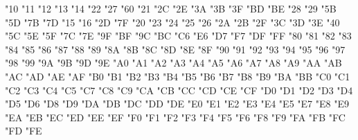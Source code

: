 \begindomaintable\relax
%
%
"10 \tldblquoteleft
"11 \tldblquoteright
"12 \tldblquotebase
"13 \tlguillemetleft
"14 \tlguillemetright
"22 \tldblquote
"27 \tlquoteright*
"60 \tlquoteleft*
\enddomaintable
\begindomaintable\relax
%
%
"21 \tlexclam*
"2C \tlcomma*
"2E \tlperiod*
"3A \tlcolon*
"3B \tlsemicolon*
"3F \tlquestion*
"BD \tlexclamdown
"BE \tlquestiondown
\enddomaintable
\begindomaintable\relax
%
%
"28 \tlparenleft*
"29 \tlparenright*
"5B \tlbracketleft*
"5D \tlbracketright*
"7B \tlbraceleft*
"7D \tlbraceright*
\enddomaintable
\begindomaintable\relax
%
%
"15 \tlendash
"16 \tlemdash
"2D \tlhyphen*
"7F \tlhyphenchar*
\enddomaintable
\begindomaintable\relax
%
%
"20 \tlvisiblespace
"23 \tlnumbersign*
"24 \tldollar*
"25 \tlpercent*
"26 \tlampersand*
"2A \tlastersik*
"2B \tlplus*
"2F \tlslash*
"3C \tlless*
"3D \tlequal*
"3E \tlgreater*
"40 \tlat*
"5C \tlbackslash*
"5E \tlasciicircumflex*
"5F \tlunderscore*
"7C \tlbar*
"7E \tlasciitilde*
"9F \tlsection
"BF \tlsterling
\enddomaintable
\begindomaintable\relax
%
%
"9C \tlIJ
"BC \tlij
"C6 \tlAE
"E6 \tlae
"D7 \tlOE
"F7 \tloe
"DF \tlEsZet
"FF \tleszet
\enddomaintable
\begindomaintable\relax
%
%
"80 \tlAbreve
"81 \tlAogonek
"82 \tlCacute
"83 \tlCcaron
"84 \tlDcaron
"85 \tlEcaron
"86 \tlEogonek
"87 \tlGbreve
"88 \tlLacute
"89 \tlLcaron
"8A \tlLslash
"8B \tlNacute
"8C \tlNcaron
"8D \tlEng
"8E \tlOhungarumlaut
"8F \tlRacute
"90 \tlRcaron
"91 \tlSacute
"92 \tlScaron
"93 \tlScommaaccent
"94 \tlTcaron
"95 \tlTcommaaccent
"96 \tlUhungarumlaut
"97 \tlUring
"98 \tlYdieresis
"99 \tlZacute
"9A \tlZcaron
"9B \tlZdotaccent
"9D \tlIdotaccent
"9E \tldcroat
"A0 \tlabreve
"A1 \tlaogonek
"A2 \tlcacute
"A3 \tlccaron
"A4 \tldcaron
"A5 \tlecaron
"A6 \tleogonek
"A7 \tlgbreve
"A8 \tllacute
"A9 \tllcaron
"AA \tllslash
"AB \tlnacute
"AC \tlncaron
"AD \tleng
"AE \tlohungarumlaut
"AF \tlracute
"B0 \tlrcaron
"B1 \tlsacute
"B2 \tlscaron
"B3 \tlscommaaccent
"B4 \tltcaron
"B5 \tltcommaaccent
"B6 \tluhungarumlaut
"B7 \tluring
"B8 \tlydieresis
"B9 \tlzacute
"BA \tlzcaron
"BB \tlzdotaccent
"C0 \tlAgrave
"C1 \tlAacute
"C2 \tlAcircumflex
"C3 \tlAtilde
"C4 \tlAdieresis
"C5 \tlAring
"C7 \tlCcedilla
"C8 \tlEgrave
"C9 \tlEacute
"CA \tlEcircumflex
"CB \tlEdieresis
"CC \tlIgrave
"CD \tlIacute
"CE \tlIcircumflex
"CF \tlIdieresis
"D0 \tlEth
"D1 \tlNtilde
"D2 \tlOgrave
"D3 \tlOacute
"D4 \tlOcircumflex
"D5 \tlOtilde
"D6 \tlOdieresis
"D8 \tlOslash
"D9 \tlUgrave
"DA \tlUacute
"DB \tlUcircumflex
"DC \tlUdieresis
"DD \tlYacute
"DE \tlThorn
"E0 \tlagrave
"E1 \tlaacute
"E2 \tlacircumflex
"E3 \tlatilde
"E4 \tladieresis
"E5 \tlaring
"E7 \tlccedilla
"E8 \tlegrave
"E9 \tleacute
"EA \tlecircumflex
"EB \tledieresis
"EC \tligrave
"ED \tliacute
"EE \tlicircumflex
"EF \tlidieresis
"F0 \tleth
"F1 \tlntilde
"F2 \tlograve
"F3 \tloacute
"F4 \tlocircumflex
"F5 \tlotilde
"F6 \tlodieresis
"F8 \tloslash
"F9 \tlugrave
"FA \tluacute
"FB \tlucircumflex
"FC \tludieresis
"FD \tlyacute
"FE \tlthorn
\enddomaintable


